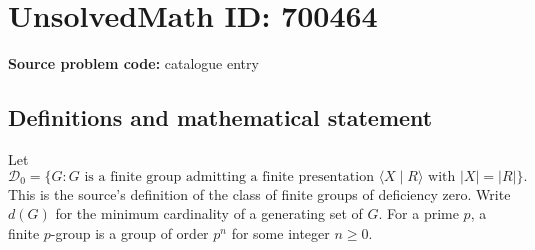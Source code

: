 \documentclass[11pt]{article}
\begin{document}
\section*{UnsolvedMath ID: 700464}
\textbf{Source problem code:} catalogue entry
\subsection{Definitions and mathematical statement}
Let
\[
\mathcal D_0=\{G: G\text{ is a finite group admitting a finite presentation }\langle X\mid R\rangle\text{ with }|X|=|R|\}.
\]
This is the source's definition of the class of finite groups of deficiency zero. Write \(d(G)\) for the minimum cardinality of a generating set of \(G\). For a prime \(p\), a finite \(p\)-group is a group of order \(p^n\) for some integer \(n\geq 0\).
\end{document}
